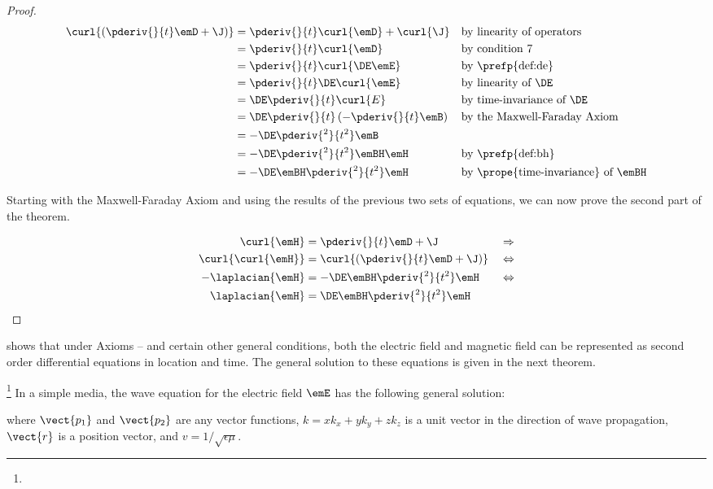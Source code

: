 \begin{proof}
\begin{align*}
   \curl{\left( \pderiv{}{t}\emD + \J \right)}
     &= \pderiv{}{t}\curl{\emD} + \curl{\J}               &&\text{by linearity of operators}
   \\&= \pderiv{}{t}\curl{\emD}                           &&\text{by condition 7}
   \\&= \pderiv{}{t}\curl{\DE \emE}                       &&\text{by \prefp{def:de}}
   \\&= \pderiv{}{t}\DE \curl{\emE}                       &&\text{by linearity of $\DE$}
   \\&= \DE \pderiv{}{t} \curl{E}                       &&\text{by time-invariance of $\DE$}
   \\&= \DE \pderiv{}{t} \left( -\pderiv{}{t}\emB \right) &&\text{by the Maxwell-Faraday Axiom}
   \\&= -\DE \pderiv{^2}{t^2} \emB
   \\&= -\DE \pderiv{^2}{t^2} \emBH\emH                     &&\text{by \prefp{def:bh}}
   \\&= -\DE\emBH \pderiv{^2}{t^2} \emH                     &&\text{by \prope{time-invariance} of $\emBH$}
\end{align*}

Starting with the Maxwell-Faraday Axiom and using
the results of the previous two sets of equations, we can now prove
the second part of the theorem.

\begin{align*}
   \curl{\emH}        &= \pderiv{}{t}\emD + \J              && \Rightarrow \\
   \curl{\curl{\emH}} &= \curl{(\pderiv{}{t}\emD + \J)}     && \Leftrightarrow \\
   - \laplacian{\emH} &= -\DE \emBH \pderiv{^2}{t^2}\emH      && \Leftrightarrow \\
   \laplacian{\emH}   &= \DE \emBH \pderiv{^2}{t^2}\emH
\end{align*}
\end{proof}

 shows that under Axioms  --  and
certain other general conditions, both the electric field and magnetic field can be
represented as second order differential equations in location and time.
The general solution to these equations is given in the next theorem.

\begin{theorem}
\label{thm:swave}
\footnote{
  }
In a simple media, the wave equation for the electric field $\emE$
has the following general solution:


where $\vect{p_1}$ and $\vect{p_2}$ are any vector functions,
$\unit{k}=\unit{x}k_x+\unit{y}k_y+\unit{z}k_z$ is a unit vector in the direction of wave propagation,
$\vect{r}$ is a position vector,
and $v=1/\sqrt{\epsilon\mu}$.
\end{theorem}

